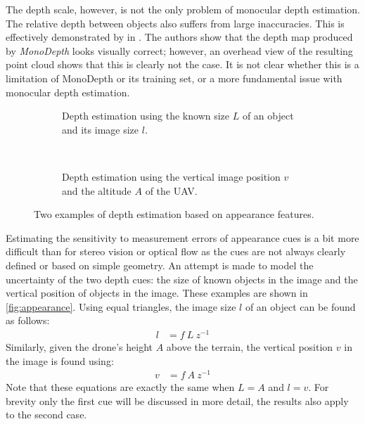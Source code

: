 The depth scale, however, is not the only problem of monocular depth estimation.
The relative depth between objects also suffers from large inaccuracies.
This is effectively demonstrated by \citeauthor{Smolyanskiy2018} in \cite{Smolyanskiy2018}.
The authors show that the depth map produced by \emph{MonoDepth} \cite{Godard2017} looks visually correct; however, an overhead view of the resulting point cloud shows that this is clearly not the case.
It is not clear whether this is a limitation of MonoDepth or its training set, or a more fundamental issue with monocular depth estimation.

\medskip

\begin{figure}
\centering
\begin{subfigure}[t]{0.45\textwidth}

\caption{Depth estimation using the known size $L$ of an object and its image size $l$.}
\end{subfigure}
~
\begin{subfigure}[t]{0.45\textwidth}

\caption{Depth estimation using the vertical image position $v$ and the altitude $A$ of the \ac{UAV}.}
\end{subfigure}
\caption{Two examples of depth estimation based on appearance features.}
\label{fig:appearance}
\end{figure}

Estimating the sensitivity to measurement errors of appearance cues is a bit more difficult than for stereo vision or optical flow as the cues are not always clearly defined or based on simple geometry.
An attempt is made to model the uncertainty of the two depth cues: the size of known objects in the image and the vertical position of objects in the image.
These examples are shown in \autoref{fig:appearance}.
Using equal triangles, the image size $l$ of an object can be found as follows:
\begin{align}
l &= f \ L \ z^{-1} \label{eq:app_size}
\end{align}
Similarly, given the drone's height $A$ above the terrain, the vertical position $v$ in the image is found using:
\begin{align}
v &= f \ A \ z^{-1}
\end{align}
Note that these equations are exactly the same when $L=A$ and $l=v$.
For brevity only the first cue will be discussed in more detail, the results also apply to the second case.


